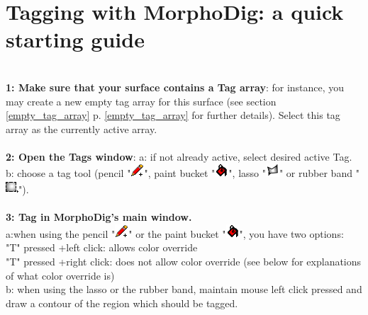 \section{Tagging with MorphoDig: a quick starting guide}\label{tag_starting_guide}
\textbf{\underline{}}\\
\textbf{1: Make sure that your surface contains a Tag array}: for instance, you may create a new empty tag array for this surface (see section \ref{empty_tag_array} p. \ref{empty_tag_array} for further details). Select this tag array as the currently active array.\\\\
\noindent
\textbf{2: Open the Tags window}: a: if not already active, select desired active Tag. b: choose a tag tool (pencil "\includegraphics[scale=0.7]{images/12/pencil.png}", paint bucket "\includegraphics[scale=0.7]{images/12/paint_bucket.png}", lasso "\includegraphics[scale=0.7]{images/12/lasso.png}" or  rubber band "\includegraphics[scale=0.7]{images/12/rubber_band.png}").  \\\\
\noindent
\textbf{3: Tag in MorphoDig's main window.} \\ a:when using the pencil "\includegraphics[scale=0.7]{images/12/pencil.png}" or the paint bucket "\includegraphics[scale=0.7]{images/12/paint_bucket.png}", you have two options:\\
 "T" pressed +left click: allows color override\\
 "T" pressed +right click: does not allow color override (see below for explanations of what color override is)\\
b: when using the lasso or the rubber band, maintain mouse left click pressed and draw a contour of the region which should be tagged.



